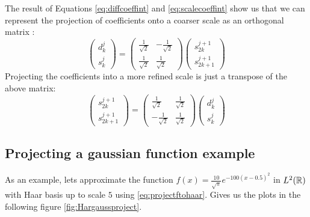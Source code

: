 \documentclass[../master_thesis.tex]{subfiles}
\begin{document}
The result of Equations \ref{eq:diffcoeffint} and \ref{eq:scalecoeffint} show us
that we can represent the projection of coefficients onto a coarser scale as an
orthogonal matrix \cite{Sorland, Beylkin:MRA}:
\begin{equation}
  \begin{pmatrix}
    d^{j}_k \\
    s^{j}_k
  \end{pmatrix} =
  \begin{pmatrix}
    \frac{1}{\sqrt{2}} & -\frac{1}{\sqrt{2}} \\
    \frac{1}{\sqrt{2}} & \frac{1}{\sqrt{2}}
  \end{pmatrix}
  \begin{pmatrix}
    s^{j+1}_{2k} \\
    s^{j+1}_{2k+1}
  \end{pmatrix}
\end{equation}
Projecting the coefficients into a more refined scale is just a transpose of the
above matrix:
\begin{equation}
  \begin{pmatrix}
    s^{j+1}_{2k} \\
    s^{j+1}_{2k+1}
  \end{pmatrix} =
  \begin{pmatrix}
    \frac{1}{\sqrt{2}} & \frac{1}{\sqrt{2}} \\
    -\frac{1}{\sqrt{2}} & \frac{1}{\sqrt{2}}
  \end{pmatrix}
  \begin{pmatrix}
    d^{j}_k \\
    s^{j}_k
  \end{pmatrix}
\end{equation}
\subsection{Projecting a gaussian function example}
As an example, lets approximate the function
$f(x) = \frac{10}{\sqrt{\pi}}e^{-100(x - 0.5)^2}$ in $L^2(\mathbb{R})$
with Haar basis up to scale $5$ using \ref{eq:projectftohaar}. Gives us the
plots in the following figure \ref{fig:Hargaussproject}.
\end{document}
